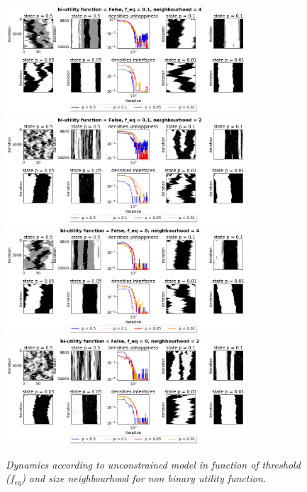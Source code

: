\begin{figure}[H]
\begin{center}
	\includegraphics[width=0.8\textwidth]{dyn1.png}
	\includegraphics[width=0.8\textwidth]{dyn2.png}
	\includegraphics[width=0.8\textwidth]{dyn3.png}
	\includegraphics[width=0.8\textwidth]{dyn4.png}
 
	\caption{\emph{ Dynamics according to unconstrained model in function of threshold ($f_{eq}$) and size neighbourhood for non binary utility function. }}
	\label{figuur3}
\end{center}
\end{figure}

